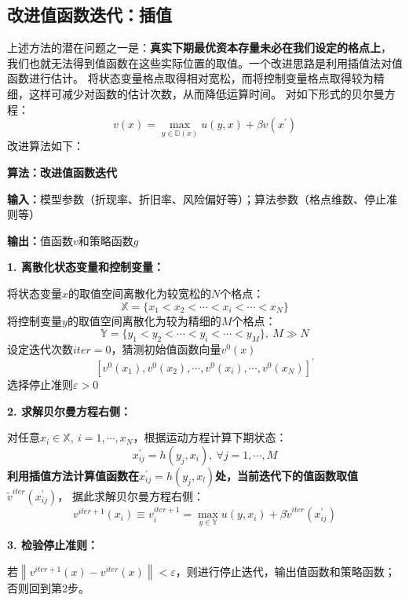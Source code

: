 \subsection{改进值函数迭代：插值}

上述方法的潜在问题之一是：\textbf{真实下期最优资本存量未必在我们设定的格点上}，
我们也就无法得到值函数在这些实际位置的取值。一个改进思路是利用插值法对值函数进行估计。
将状态变量格点取得相对宽松，而将控制变量格点取得较为精细，这样可减少对函数的估计次数，从而降低运算时间。
对如下形式的贝尔曼方程：
\begin{equation*}
    v(x) = \max_{y\in\mathbb{D}(x)} u(y,x) + \beta v(x^{\prime})
\end{equation*}
改进算法如下：

\begin{mdframed}[linecolor=Black,linewidth=1pt]
    \textbf{算法：改进值函数迭代}

    \textbf{输入：}模型参数（折现率、折旧率、风险偏好等）；算法参数（格点维数、停止准则等）

    \textbf{输出：}值函数$v$和策略函数$g$

    \textbf{1. 离散化状态变量和控制变量：}

    将状态变量$x$的取值空间离散化为较宽松的$N$个格点：
    \begin{equation*}
        \mathbb{X} = \{x_1<x_2<\cdots<x_i<\cdots<x_N\}
    \end{equation*}
    将控制变量$y$的取值空间离散化为较为精细的$M$个格点：
    \begin{equation*}
        \mathbb{Y} = \{y_1<y_2<\cdots<y_i<\cdots<y_M\}, ~ M \gg N
    \end{equation*}
    设定迭代次数$iter=0$，猜测初始值函数向量$v^0(x)$
    \begin{equation*}
        \left[v^0(x_1),v^0(x_2),\cdots,v^0(x_i),\cdots,v^0(x_N)\right]^{\prime}
    \end{equation*}
    选择停止准则$\varepsilon>0$

    \textbf{2. 求解贝尔曼方程右侧：}

    对任意$x_{i}\in\mathbb{X},~ i=1,\cdots,x_N$，根据运动方程计算下期状态：
    \begin{equation*}
        x^{\prime}_{ij} = h(y_j,x_i), ~\forall j=1,\cdots,M
    \end{equation*}
    \textbf{利用插值方法计算值函数在$x^{\prime}_{ij}=h(y_j,x_l)$处，当前迭代下的值函数取值}$\tilde{v}^{iter}(x^{\prime}_{ij})$，
    据此求解贝尔曼方程右侧：
    \begin{equation*}
        v^{iter+1}(x_i) \equiv v^{iter+1}_i = \max_{y\in\mathbb{Y}} u\left(y,x_i\right)
            + \beta \tilde{v}^{iter}(x^{\prime}_{ij})
    \end{equation*}

    \textbf{3. 检验停止准则：}

    若$\left\|v^{iter+1}(x)-v^{iter}(x)\right\|<\varepsilon$，则进行停止迭代，输出值函数和策略函数；
    否则回到第2步。
\end{mdframed}


